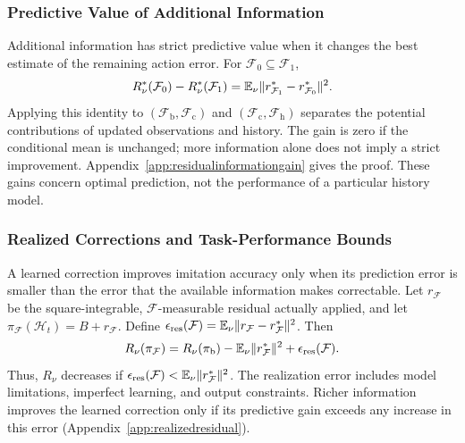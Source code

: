 \subsubsection{Predictive Value of Additional Information}
Additional information has strict predictive value when it changes the best estimate of the remaining action error.
For $\mathcal F_0\subseteq\mathcal F_1$,
\begin{equation}
 R_\nu^*(\mathcal F_0)-R_\nu^*(\mathcal F_1)
 =\mathbb E_\nu\lVert r_{\mathcal F_1}^*-r_{\mathcal F_0}^*\rVert^2.
 \label{eq:residualinformationgain}
\end{equation}
Applying this identity to $(\mathcal F_{\mathrm b},\mathcal F_{\mathrm c})$ and $(\mathcal F_{\mathrm c},\mathcal F_{\mathrm h})$ separates the potential contributions of updated observations and history.
The gain is zero if the conditional mean is unchanged; more information alone does not imply a strict improvement.
Appendix~\ref{app:residualinformationgain} gives the proof.
These gains concern optimal prediction, not the performance of a particular history model.

\subsubsection{Realized Corrections and Task-Performance Bounds}
A learned correction improves imitation accuracy only when its prediction error is smaller than the error that the available information makes correctable.
Let $r_{\mathcal F}$ be the square-integrable, $\mathcal F$-measurable residual actually applied, and let $\pi_{\mathcal F}(\mathcal H_t)=B+r_{\mathcal F}$.
Define $\epsilon_{\mathrm{res}}(\mathcal F)=\mathbb E_\nu\lVert r_{\mathcal F}-r_{\mathcal F}^*\rVert^2$.
Then
\begin{equation}
 R_\nu(\pi_{\mathcal F})
 =R_\nu(\pi_{\mathrm b})
  -\mathbb E_\nu\lVert r_{\mathcal F}^*\rVert^2
  +\epsilon_{\mathrm{res}}(\mathcal F).
 \label{eq:realizedresidualrisk}
\end{equation}
Thus, $R_\nu$ decreases if $\epsilon_{\mathrm{res}}(\mathcal F)<\mathbb E_\nu\lVert r_{\mathcal F}^*\rVert^2$.
The realization error includes model limitations, imperfect learning, and output constraints.
Richer information improves the learned correction only if its predictive gain exceeds any increase in this error (Appendix~\ref{app:realizedresidual}).

